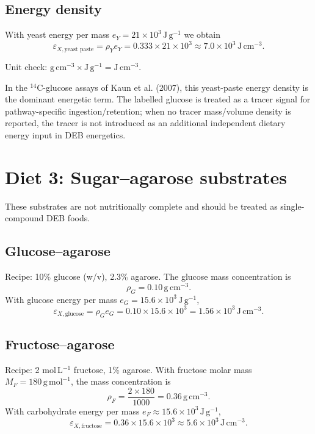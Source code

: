 \documentclass[11pt]{article}
\begin{document}
\subsection{Energy density}

With yeast energy per mass $e_Y = 21\times10^{3}\,\mathrm{J\,g^{-1}}$ we obtain
\begin{equation}
  \varepsilon_{X,\text{yeast paste}} = \rho_Y e_Y = 0.333\times 21\times10^{3} \approx 7.0\times10^{3}\,\mathrm{J\,cm^{-3}}.
\end{equation}

Unit check: $\mathrm{g\,cm^{-3}}\times \mathrm{J\,g^{-1}} = \mathrm{J\,cm^{-3}}$.

In the $^{14}$C-glucose assays of Kaun et al. (2007), this yeast-paste energy density is the dominant energetic term. The labelled glucose is treated as a tracer signal for pathway-specific ingestion/retention; when no tracer mass/volume density is reported, the tracer is not introduced as an additional independent dietary energy input in DEB energetics.

\section{Diet 3: Sugar--agarose substrates}

These substrates are not nutritionally complete and should be treated as single-compound DEB foods.

\subsection{Glucose--agarose}

Recipe: 10\% glucose (w/v), 2.3\% agarose. The glucose mass concentration is
\begin{equation}
  \rho_G = 0.10\,\mathrm{g\,cm^{-3}}.
\end{equation}
With glucose energy per mass $e_G = 15.6\times10^{3}\,\mathrm{J\,g^{-1}}$,
\begin{equation}
  \varepsilon_{X,\text{glucose}} = \rho_G e_G = 0.10\times 15.6\times10^{3} = 1.56\times10^{3}\,\mathrm{J\,cm^{-3}}.
\end{equation}

\subsection{Fructose--agarose}

Recipe: 2 mol\,L$^{-1}$ fructose, 1\% agarose. With fructose molar mass $M_F = 180\,\mathrm{g\,mol^{-1}}$, the mass concentration is
\begin{equation}
  \rho_F = \frac{2\times 180}{1000} = 0.36\,\mathrm{g\,cm^{-3}}.
\end{equation}
With carbohydrate energy per mass $e_F \approx 15.6\times10^{3}\,\mathrm{J\,g^{-1}}$,
\begin{equation}
  \varepsilon_{X,\text{fructose}} = 0.36\times 15.6\times10^{3} \approx 5.6\times10^{3}\,\mathrm{J\,cm^{-3}}.
\end{equation}
\end{document}
